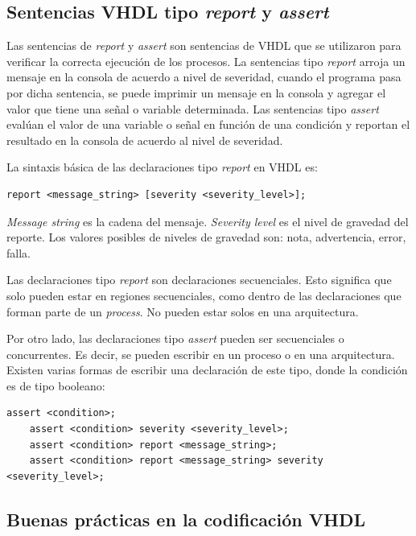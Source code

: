 \subsection{Sentencias VHDL tipo \textit{report} y \textit{assert}}
Las sentencias de \textit{report} y \textit{assert} son sentencias de VHDL que se utilizaron para verificar la correcta ejecución de los procesos. La sentencias tipo \textit{report} arroja un mensaje en la consola de acuerdo a nivel de severidad, cuando el programa pasa por dicha sentencia, se puede imprimir un mensaje en la consola y agregar el valor que tiene una señal o variable determinada. Las sentencias tipo \textit{assert} evalúan el valor de una variable o señal en función de una condición y reportan el resultado en la consola de acuerdo al nivel de severidad.

La sintaxis básica de las declaraciones tipo \textit{report} en VHDL es:


\begin{lstlisting}[caption= "Sintaxis tipo \textit{report}"]
	report <message_string> [severity <severity_level>];
\end{lstlisting}


\textit{Message string} es la cadena del mensaje. \textit{Severity level} es el nivel de gravedad del reporte. Los valores posibles de niveles de gravedad son: nota, advertencia, error, falla.

Las declaraciones tipo \textit{report} son declaraciones secuenciales. Esto significa que solo pueden estar en regiones secuenciales, como dentro de las declaraciones que forman parte de un \textit{process}. No pueden estar solos en una arquitectura.

Por otro lado, las declaraciones tipo \textit{assert} pueden ser secuenciales o concurrentes. Es decir, se pueden escribir en un proceso o en una arquitectura. Existen varias formas de escribir una declaración de este tipo, donde la condición es de tipo booleano:


\begin{lstlisting}[caption= "Sintaxis tipo \textit{assert}"]
	assert <condition>;
	assert <condition> severity <severity_level>;
	assert <condition> report <message_string>;
	assert <condition> report <message_string> severity <severity_level>;
\end{lstlisting}

\subsection{Buenas prácticas en la codificación VHDL}

